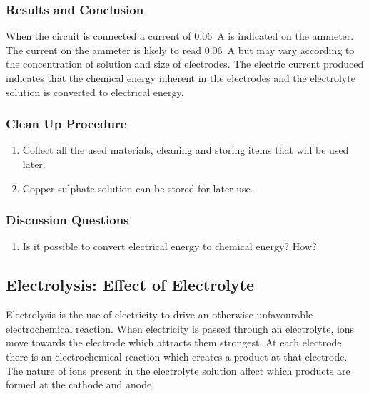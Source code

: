 \subsubsection*{Results and Conclusion}
When the circuit is connected a current of 0.06~A is indicated on the ammeter. The current on the ammeter is likely to read 0.06~A but may vary according to the concentration of solution and size of electrodes. The electric current produced indicates that the chemical energy inherent in the electrodes and the electrolyte solution is converted to electrical energy.

\subsubsection*{Clean Up Procedure}
\begin{enumerate}
\item{Collect all the used materials, cleaning and storing items that will be used later.}
\item{Copper sulphate solution can be stored for later use.}
\end{enumerate}

\subsubsection*{Discussion Questions}
\begin{enumerate}
\item{Is it possible to convert electrical energy to chemical energy? How?}
\end{enumerate}


\subsection{Electrolysis: Effect of Electrolyte}

Electrolysis is the use of electricity to drive an otherwise unfavourable electrochemical reaction. When electricity is passed through an electrolyte, ions move towards the electrode which attracts them strongest. At each electrode there is an electrochemical reaction which creates a product at that electrode. The nature of ions present in the electrolyte solution affect which products are formed at the cathode and anode.

